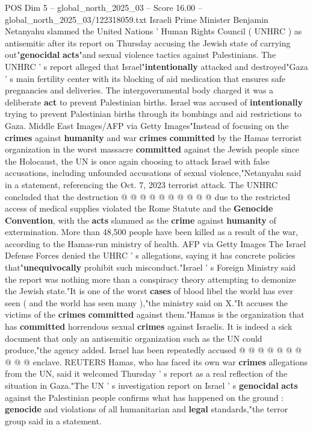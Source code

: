 \begin{textsample}{POS Dim 5 – global\_north\_2025\_03 – Score 16.00 – global\_north\_2025\_03/122318059.txt}  \label{ex:f5_pos_160}
Israeli Prime Minister Benjamin Netanyahu slammed the United Nations ' Human Rights Council ( UNHRC ) as antisemitic after its report on Thursday accusing the Jewish state of carrying out"\textbf{genocidal} \textbf{acts}"and sexual violence tactics against Palestinians.
The UNHRC ' s report alleged that Israel"\textbf{intentionally} attacked and destroyed"Gaza ' s main fertility center with its blocking of aid medication that ensures safe pregnancies and deliveries.
The intergovernmental body charged it was a deliberate \textbf{act} to prevent Palestinian births.
Israel was accused of \textbf{intentionally} trying to prevent Palestinian births through its bombings and aid restrictions to Gaza.
Middle East Images/AFP via Getty Images"Instead of focusing on the \textbf{crimes} against \textbf{humanity} and war \textbf{crimes} \textbf{committed} by the Hamas terrorist organization in the worst massacre \textbf{committed} against the Jewish people since the Holocaust, the UN is once again choosing to attack Israel with false accusations, including unfounded accusations of sexual violence,"Netanyahu said in a statement, referencing the Oct. 7, 2023 terrorist attack.
The UNHRC concluded that the destruction @ @ @ @ @ @ @ @ @ @ due to the restricted access of medical supplies violated the Rome Statute and the \textbf{Genocide} \textbf{Convention}, with the \textbf{acts} slammed as the \textbf{crime} against \textbf{humanity} of extermination.
More than 48,500 people have been killed as a result of the war, according to the Hamas-run ministry of health.
AFP via Getty Images The Israel Defense Forces denied the UHRC ' s allegations, saying it has concrete policies that"\textbf{unequivocally} prohibit such misconduct."Israel ' s Foreign Ministry said the report was nothing more than a conspiracy theory attempting to demonize the Jewish state."It is one of the worst \textbf{cases} of blood libel the world has ever seen ( and the world has seen many ),"the ministry said on X."It accuses the victims of the \textbf{crimes} \textbf{committed} against them."Hamas is the organization that has \textbf{committed} horrendous sexual \textbf{crimes} against Israelis.
It is indeed a sick document that only an antisemitic organization such as the UN could produce,"the agency added.
Israel has been repeatedly accused @ @ @ @ @ @ @ @ @ @ enclave.
REUTERS Hamas, who has faced its own war \textbf{crimes} allegations from the UN, said it welcomed Thursday ' s report as a real reflection of the situation in Gaza."The UN ' s investigation report on Israel ' s \textbf{genocidal} \textbf{acts} against the Palestinian people confirms what has happened on the ground : \textbf{genocide} and violations of all humanitarian and \textbf{legal} standards,"the terror group said in a statement.

\end{textsample}
